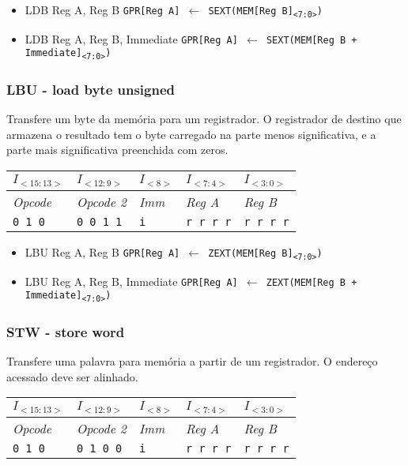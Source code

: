 \documentclass[11pt,a4paper]{report}
\begin{document}
\begin{itemize}
\item LDB Reg A, Reg B
\subitem \texttt{GPR[Reg A] $\leftarrow$ SEXT(MEM[Reg B]\textsubscript{<7:0>})}
\item LDB Reg A, Reg B, Immediate
\subitem \texttt{GPR[Reg A] $\leftarrow$ SEXT(MEM[Reg B + Immediate]\textsubscript{<7:0>})}
\end{itemize}

\subsubsection{LBU - load byte unsigned}

Transfere um byte da memória para um registrador. O registrador de
destino que armazena o resultado tem o byte carregado na parte menos
significativa, e a parte mais significativa preenchida com zeros.

\begin{table}[htb!]
\centering
\begin{tabular}{|p{2cm}|p{2cm}|p{2cm}|p{2cm}|p{2cm}|}
\hline
$I_{<15:13>}$ & $I_{<12:9>}$ & $I_{<8>}$ & $I_{<7:4>}$ & $I_{<3:0>}$  \\ \hline
\textit{Opcode} & \textit{Opcode 2} & \textit{Imm} & \textit{Reg A} & \textit{Reg B} \\ \hline
\texttt{0 1 0} & \texttt{0 0 1 1} & \texttt{i} & \texttt{r r r r} & \texttt{r r r r} \\ \hline
\end{tabular}
\end{table}

\begin{itemize}
\item LBU Reg A, Reg B
\subitem \texttt{GPR[Reg A] $\leftarrow$ ZEXT(MEM[Reg B]\textsubscript{<7:0>})}
\item LBU Reg A, Reg B, Immediate
\subitem \texttt{GPR[Reg A] $\leftarrow$ ZEXT(MEM[Reg B + Immediate]\textsubscript{<7:0>})}
\end{itemize}

\subsubsection{STW - store word}

Transfere uma palavra para memória a partir de um registrador. O endereço
acessado deve ser alinhado.

\begin{table}[htb!]
\centering
\begin{tabular}{|p{2cm}|p{2cm}|p{2cm}|p{2cm}|p{2cm}|}
\hline
$I_{<15:13>}$ & $I_{<12:9>}$ & $I_{<8>}$ & $I_{<7:4>}$ & $I_{<3:0>}$  \\ \hline
\textit{Opcode} & \textit{Opcode 2} & \textit{Imm} & \textit{Reg A} & \textit{Reg B} \\ \hline
\texttt{0 1 0} & \texttt{0 1 0 0} & \texttt{i} & \texttt{r r r r} & \texttt{r r r r} \\ \hline
\end{tabular}
\end{table}
\end{document}
